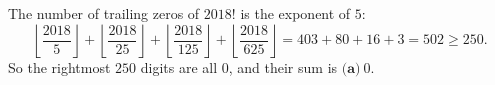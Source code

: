The number of trailing zeros of $2018!$ is the exponent of $5$:
\[
\left\lfloor\dfrac{2018}{5}\right\rfloor+\left\lfloor\dfrac{2018}{25}\right\rfloor+\left\lfloor\dfrac{2018}{125}\right\rfloor+\left\lfloor\dfrac{2018}{625}\right\rfloor=403+80+16+3=502\ge250 .
\]
So the rightmost $250$ digits are all $0$, and their sum is $\boxed{\textbf{(a)}\ 0}$.
